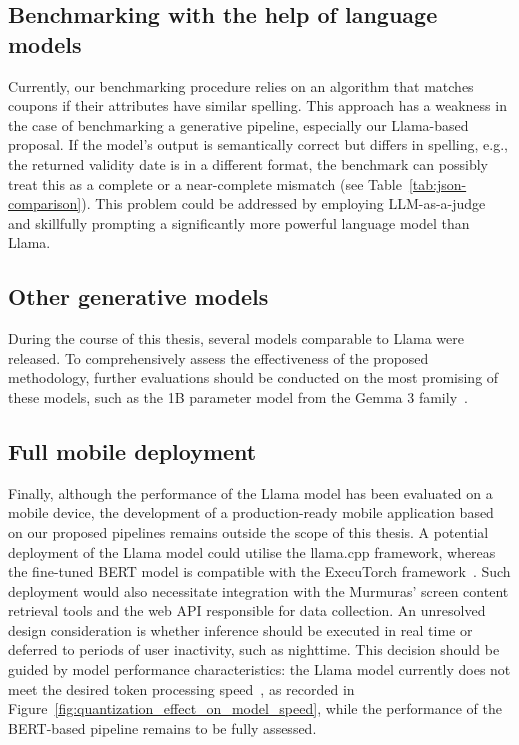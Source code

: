 \documentclass[licencjacka,en]{pracamgr}
\begin{document}
\subsection{Benchmarking with the help of language models}

Currently, our benchmarking procedure relies on an algorithm that matches coupons if their attributes have similar spelling. This approach has a weakness in the case of benchmarking a generative pipeline, especially our Llama-based proposal. If the model's output is semantically correct but differs in spelling, e.g., the returned validity date is in a different format, the benchmark can possibly treat this as a complete or a near-complete mismatch (see Table~\ref{tab:json-comparison}). This problem could be addressed by employing LLM-as-a-judge and skillfully prompting a significantly more powerful language model than Llama.

\subsection{Other generative models}

During the course of this thesis, several models comparable to Llama were released. To comprehensively assess the effectiveness of the proposed methodology, further evaluations should be conducted on the most promising of these models, such as the 1B parameter model from the Gemma 3 family~\cite{gemmateam2025gemma3technicalreport}.

\subsection{Full mobile deployment}

Finally, although the performance of the Llama model has been evaluated on a mobile device, the development of a production-ready mobile application based on our proposed pipelines remains outside the scope of this thesis. A potential deployment of the Llama model could utilise the llama.cpp framework, whereas the fine-tuned BERT model is compatible with the ExecuTorch framework~\cite{bert_executorch}. Such deployment would also necessitate integration with the Murmuras' screen content retrieval tools and the web API responsible for data collection. An unresolved design consideration is whether inference should be executed in real time or deferred to periods of user inactivity, such as nighttime. This decision should be guided by model performance characteristics: the Llama model currently does not meet the desired token processing speed~\cite{token_performance}, as recorded in Figure~\ref{fig:quantization_effect_on_model_speed}, while the performance of the BERT-based pipeline remains to be fully assessed.
\end{document}
